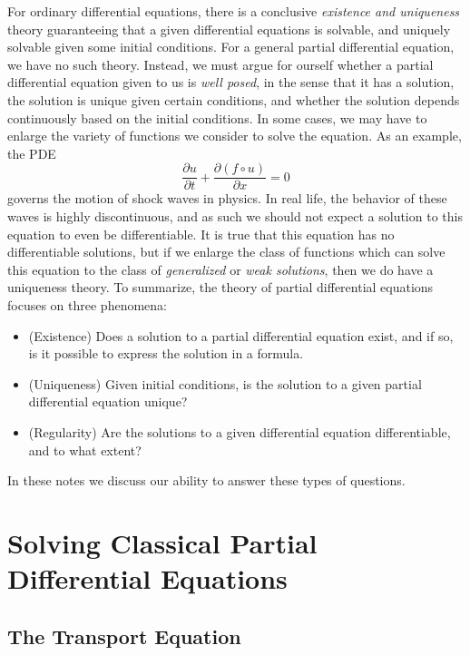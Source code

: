 For ordinary differential equations, there is a conclusive {\it existence and uniqueness} theory guaranteeing that a given differential equations is solvable, and uniquely solvable given some initial conditions. For a general partial differential equation, we have no such theory. Instead, we must argue for ourself whether a partial differential equation given to us is {\it well posed}, in the sense that it has a solution, the solution is unique given certain conditions, and whether the solution depends continuously based on the initial conditions. In some cases, we may have to enlarge the variety of functions we consider to solve the equation. As an example, the PDE
%
\[ \frac{\partial u}{\partial t} + \frac{\partial (f \circ u)}{\partial x} = 0 \]
%
governs the motion of shock waves in physics. In real life, the behavior of these waves is highly discontinuous, and as such we should not expect a solution to this equation to even be differentiable. It is true that this equation has no differentiable solutions, but if we enlarge the class of functions which can solve this equation to the class of {\it generalized} or {\it weak solutions}, then we do have a uniqueness theory. To summarize, the theory of partial differential equations focuses on three phenomena:
%
\begin{itemize}
    \item (Existence) Does a solution to a partial differential equation exist, and if so, is it possible to express the solution in a formula.

    \item (Uniqueness) Given initial conditions, is the solution to a given partial differential equation unique?

    \item (Regularity) Are the solutions to a given differential equation differentiable, and to what extent?
\end{itemize}
%
In these notes we discuss our ability to answer these types of questions.

\chapter{Solving Classical Partial Differential Equations}

\section{The Transport Equation}


